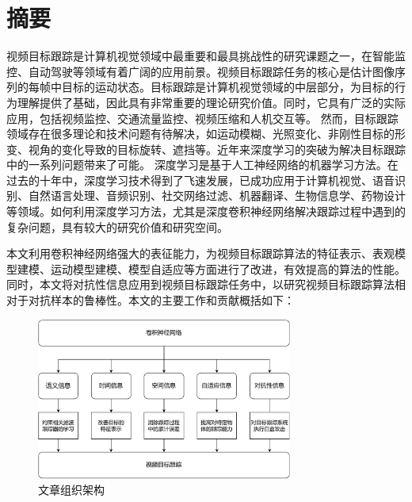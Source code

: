 \maketitle%
\MAKETITLE%
\makedeclaration%
\intobmk\chapter*{摘\quad 要}%
\setcounter{page}{1}%

视频目标跟踪是计算机视觉领域中最重要和最具挑战性的研究课题之一，在智能监控、自动驾驶等领域有着广阔的应用前景。视频目标跟踪任务的核心是估计图像序列的每帧中目标的运动状态。目标跟踪是计算机视觉领域的中层部分，为目标的行为理解提供了基础，因此具有非常重要的理论研究价值。同时，它具有广泛的实际应用，包括视频监控、交通流量监控、视频压缩和人机交互等。
然而，目标跟踪领域存在很多理论和技术问题有待解决，如运动模糊、光照变化、非刚性目标的形变、视角的变化导致的目标旋转、遮挡等。近年来深度学习的突破为解决目标跟踪中的一系列问题带来了可能。
深度学习是基于人工神经网络的机器学习方法。在过去的十年中，深度学习技术得到了飞速发展，已成功应用于计算机视觉、语音识别、自然语言处理、音频识别、社交网络过滤、机器翻译、生物信息学、药物设计等领域。如何利用深度学习方法，尤其是深度卷积神经网络解决跟踪过程中遇到的复杂问题，具有较大的研究价值和研究空间。

本文利用卷积神经网络强大的表征能力，为视频目标跟踪算法的特征表示、表观模型建模、运动模型建模、模型自适应等方面进行了改进，有效提高的算法的性能。同时，本文将对抗性信息应用到视频目标跟踪任务中，以研究视频目标跟踪算法相对于对抗样本的鲁棒性。本文的主要工作和贡献概括如下：

\begin{figure}
\centering
\includegraphics[width=0.75\textwidth]{Img/paper_arch.pdf}
\caption{文章组织架构}
\end{figure}

